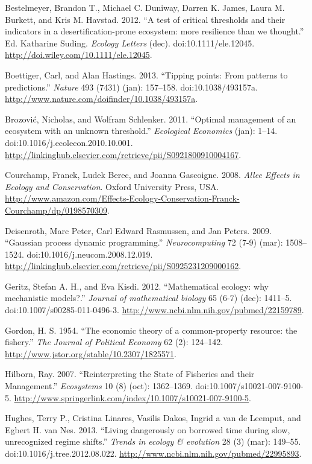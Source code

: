 \documentclass[author-year, review]{elsarticle} %
\begin{document}
Bestelmeyer, Brandon T., Michael C. Duniway, Darren K. James, Laura M.
Burkett, and Kris M. Havstad. 2012. ``A test of critical thresholds and
their indicators in a desertification-prone ecosystem: more resilience
than we thought.'' Ed. Katharine Suding. \emph{Ecology Letters} (dec).
doi:10.1111/ele.12045. \url{http://doi.wiley.com/10.1111/ele.12045}.

Boettiger, Carl, and Alan Hastings. 2013. ``Tipping points: From
patterns to predictions.'' \emph{Nature} 493 (7431) (jan): 157--158.
doi:10.1038/493157a.
\url{http://www.nature.com/doifinder/10.1038/493157a}.

Brozović, Nicholas, and Wolfram Schlenker. 2011. ``Optimal management of
an ecosystem with an unknown threshold.'' \emph{Ecological Economics}
(jan): 1--14. doi:10.1016/j.ecolecon.2010.10.001.
\url{http://linkinghub.elsevier.com/retrieve/pii/S0921800910004167}.

Courchamp, Franck, Ludek Berec, and Joanna Gascoigne. 2008. \emph{Allee
Effects in Ecology and Conservation}. Oxford University Press, USA.
\url{http://www.amazon.com/Effects-Ecology-Conservation-Franck-Courchamp/dp/0198570309}.

Deisenroth, Marc Peter, Carl Edward Rasmussen, and Jan Peters. 2009.
``Gaussian process dynamic programming.'' \emph{Neurocomputing} 72 (7-9)
(mar): 1508--1524. doi:10.1016/j.neucom.2008.12.019.
\url{http://linkinghub.elsevier.com/retrieve/pii/S0925231209000162}.

Geritz, Stefan A. H., and Eva Kisdi. 2012. ``Mathematical ecology: why
mechanistic models?.'' \emph{Journal of mathematical biology} 65 (6-7)
(dec): 1411--5. doi:10.1007/s00285-011-0496-3.
\url{http://www.ncbi.nlm.nih.gov/pubmed/22159789}.

Gordon, H. S. 1954. ``The economic theory of a common-property resource:
the fishery.'' \emph{The Journal of Political Economy} 62 (2): 124--142.
\url{http://www.jstor.org/stable/10.2307/1825571}.

Hilborn, Ray. 2007. ``Reinterpreting the State of Fisheries and their
Management.'' \emph{Ecosystems} 10 (8) (oct): 1362--1369.
doi:10.1007/s10021-007-9100-5.
\url{http://www.springerlink.com/index/10.1007/s10021-007-9100-5}.

Hughes, Terry P., Cristina Linares, Vasilis Dakos, Ingrid a van de
Leemput, and Egbert H. van Nes. 2013. ``Living dangerously on borrowed
time during slow, unrecognized regime shifts.'' \emph{Trends in ecology
\& evolution} 28 (3) (mar): 149--55. doi:10.1016/j.tree.2012.08.022.
\url{http://www.ncbi.nlm.nih.gov/pubmed/22995893}.
\end{document}
